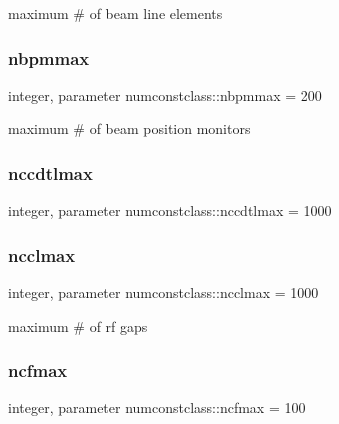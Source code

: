 maximum \# of beam line elements 

\mbox{\label{namespacenumconstclass_a2a11d40986bf0aa3873c57eccd9cdfac}} 
\subsubsection{\texorpdfstring{nbpmmax}{nbpmmax}}
{\footnotesize\ttfamily integer, parameter numconstclass\+::nbpmmax = 200}



maximum \# of beam position monitors 

\mbox{\label{namespacenumconstclass_a27ee6b57f509d99358609230f3ea289a}} 
\subsubsection{\texorpdfstring{nccdtlmax}{nccdtlmax}}
{\footnotesize\ttfamily integer, parameter numconstclass\+::nccdtlmax = 1000}

\mbox{\label{namespacenumconstclass_ad4189a0ff5d1f4848364ea3012cddfd0}} 
\subsubsection{\texorpdfstring{ncclmax}{ncclmax}}
{\footnotesize\ttfamily integer, parameter numconstclass\+::ncclmax = 1000}



maximum \# of rf gaps 

\mbox{\label{namespacenumconstclass_a94e49bcdcfdd3ed05de0d41af396f4d1}} 
\subsubsection{\texorpdfstring{ncfmax}{ncfmax}}
{\footnotesize\ttfamily integer, parameter numconstclass\+::ncfmax = 100}

